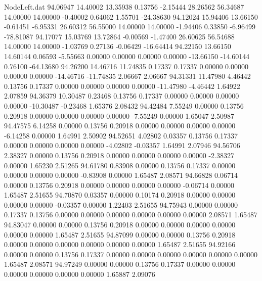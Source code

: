 \begin{filecontents}{NodeLeft.dat}
  94.06947   14.40002   13.35938     0.13756   -2.15444   28.26562   56.34687   14.00000   14.00000   -0.40002    0.64062    1.55701  -24.38630
  94.12024   15.94406   13.66150    -0.61451   -6.95331   26.60312   56.55000   14.00000   14.00000   -1.94406    0.33850   -6.96499  -78.81087
  94.17077   15.03769   13.72864    -0.00569   -1.47400   26.60625   56.54688   14.00000   14.00000   -1.03769    0.27136   -0.06429  -16.64414
  94.22150   13.66150   14.60144     0.06593   -5.55663    0.00000    0.00000    0.00000    0.00000  -13.66150  -14.60144    0.76100  -64.13680
  94.26200   14.46716   11.74835     0.17337    0.17337    0.00000    0.00000    0.00000    0.00000  -14.46716  -11.74835    2.06667    2.06667
  94.31331   11.47980    4.46442     0.13756    0.17337    0.00000    0.00000    0.00000    0.00000  -11.47980   -4.46442    1.64922    2.07859
  94.36379   10.30487    0.23468     0.13756    0.17337    0.00000    0.00000    0.00000    0.00000  -10.30487   -0.23468    1.65376    2.08432
  94.42484    7.55249    0.00000     0.13756    0.20918    0.00000    0.00000    0.00000    0.00000   -7.55249    0.00000    1.65047    2.50987
  94.47575    6.14258    0.00000     0.13756    0.20918    0.00000    0.00000    0.00000    0.00000   -6.14258    0.00000    1.64991    2.50902
  94.52651    4.02802    0.03357     0.13756    0.17337    0.00000    0.00000    0.00000    0.00000   -4.02802   -0.03357    1.64991    2.07946
  94.56706    2.38327    0.00000     0.13756    0.20918    0.00000    0.00000    0.00000    0.00000   -2.38327    0.00000    1.65230    2.51265
  94.61780    0.83908    0.00000     0.13756    0.17337    0.00000    0.00000    0.00000    0.00000   -0.83908    0.00000    1.65487    2.08571
  94.66828    0.06714    0.00000     0.13756    0.20918    0.00000    0.00000    0.00000    0.00000   -0.06714    0.00000    1.65487    2.51655
  94.70870    0.03357    0.00000     0.10174    0.20918    0.00000    0.00000    0.00000    0.00000   -0.03357    0.00000    1.22403    2.51655
  94.75943    0.00000    0.00000     0.17337    0.13756    0.00000    0.00000    0.00000    0.00000    0.00000    0.00000    2.08571    1.65487
  94.83047    0.00000    0.00000     0.13756    0.20918    0.00000    0.00000    0.00000    0.00000    0.00000    0.00000    1.65487    2.51655
  94.87099    0.00000    0.00000     0.13756    0.20918    0.00000    0.00000    0.00000    0.00000    0.00000    0.00000    1.65487    2.51655
  94.92166    0.00000    0.00000     0.13756    0.17337    0.00000    0.00000    0.00000    0.00000    0.00000    0.00000    1.65487    2.08571
  94.97249    0.00000    0.00000     0.13756    0.17337    0.00000    0.00000    0.00000    0.00000    0.00000    0.00000    1.65887    2.09076

\end{filecontents}
